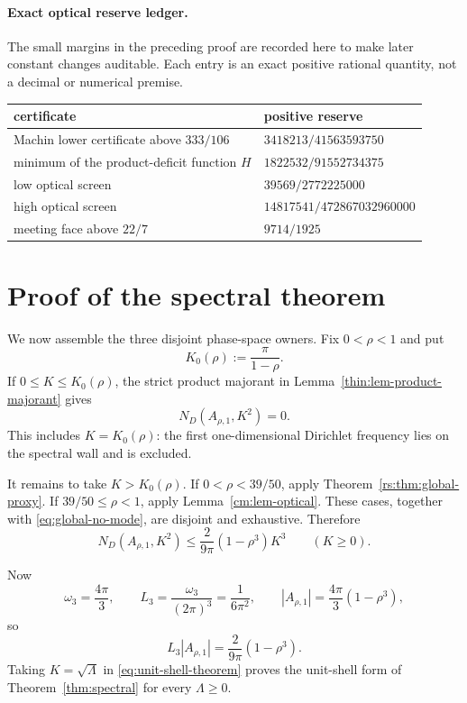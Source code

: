 \documentclass[11pt]{article}
\numberwithin{equation}{section}
\theoremstyle{definition}
\theoremstyle{remark}
\begin{document}
\paragraph{Exact optical reserve ledger.}
The small margins in the preceding proof are recorded here to make later
constant changes auditable.  Each entry is an exact positive rational
quantity, not a decimal or numerical premise.
\begin{center}
\small
\begin{tabular}{@{}ll@{}}
\toprule
certificate&positive reserve\\
\midrule
Machin lower certificate above \(333/106\)&
\(3418213/41563593750\)\\
minimum of the product-deficit function \(H\)&
\(1822532/91552734375\)\\
low optical screen&\(39569/2772225000\)\\
high optical screen&\(14817541/472867032960000\)\\
meeting face above \(22/7\)&\(9714/1925\)\\
\bottomrule
\end{tabular}
\end{center}

\section{Proof of the spectral theorem}

We now assemble the three disjoint phase-space owners.  Fix
\(0<\rho<1\) and put
\[
 K_0(\rho):=\frac{\pi}{1-\rho}.
\]
If \(0\leq K\leq K_0(\rho)\), the strict product majorant in
Lemma~\ref{thin:lem-product-majorant} gives
\begin{equation}
 N_D(A_{\rho,1},K^2)=0.
 \label{eq:global-no-mode}
\end{equation}
This includes \(K=K_0(\rho)\): the first one-dimensional Dirichlet
frequency lies on the spectral wall and is excluded.

It remains to take \(K>K_0(\rho)\).  If
\(0<\rho<39/50\), apply
Theorem~\ref{rs:thm:global-proxy}.  If
\(39/50\leq\rho<1\), apply Lemma~\ref{cm:lem-optical}.  These cases,
together with \eqref{eq:global-no-mode}, are disjoint and exhaustive.
Therefore
\begin{equation}
  N_D(A_{\rho,1},K^2)
  \le\frac{2}{9\pi}(1-\rho^3)K^3
  \qquad(K\ge0).
  \label{eq:unit-shell-theorem}
\end{equation}

Now
\[
  \omega_3=\frac{4\pi}{3},
  \qquad
  L_3=\frac{\omega_3}{(2\pi)^3}=\frac1{6\pi^2},
  \qquad
  |A_{\rho,1}|=\frac{4\pi}{3}(1-\rho^3),
\]
so
\begin{equation}
  L_3|A_{\rho,1}|=\frac{2}{9\pi}(1-\rho^3).
  \label{eq:weyl-normalization}
\end{equation}
Taking \(K=\sqrt\Lambda\) in \eqref{eq:unit-shell-theorem} proves the
unit-shell form of Theorem~\ref{thm:spectral} for every \(\Lambda\ge0\).
\end{document}
